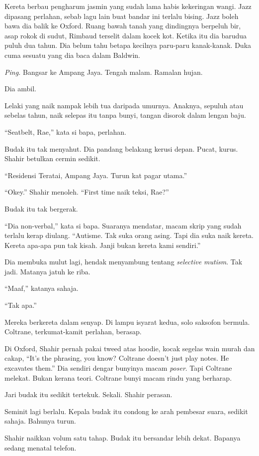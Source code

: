 \documentclass[
  11pt,
  a5paper,
  openany,
  oneside]{book}
\begin{document}
Kereta berbau pengharum jasmin yang sudah lama habis kekeringan wangi.
Jazz dipasang perlahan, sebab lagu lain buat bandar ini terlalu bising.
Jazz boleh bawa dia balik ke Oxford. Ruang bawah tanah yang dindingnya
berpeluh bir, asap rokok di sudut, Rimbaud terselit dalam kocek kot.
Ketika itu dia barudua puluh dua tahun. Dia belum tahu betapa kecilnya
paru-paru kanak-kanak. Duka cuma sesuatu yang dia baca dalam Baldwin.

\emph{Ping.} Bangsar ke Ampang Jaya. Tengah malam. Ramalan hujan.

Dia ambil.

Lelaki yang naik nampak lebih tua daripada umurnya. Anaknya, sepuluh
atau sebelas tahun, naik selepas itu tanpa bunyi, tangan disorok dalam
lengan baju.

``Seatbelt, Rae,'' kata si bapa, perlahan.

Budak itu tak menyahut. Dia pandang belakang kerusi depan. Pucat, kurus.
Shahir betulkan cermin sedikit.

``Residensi Teratai, Ampang Jaya. Turun kat pagar utama.''

``Okey.'' Shahir menoleh. ``First time naik teksi, Rae?''

Budak itu tak bergerak.

``Dia non-verbal,'' kata si bapa. Suaranya mendatar, macam skrip yang
sudah terlalu kerap diulang. ``Autisme. Tak suka orang asing. Tapi dia
suka naik kereta. Kereta apa-apa pun tak kisah. Janji bukan kereta kami
sendiri.''

Dia membuka mulut lagi, hendak menyambung tentang \emph{selective
mutism}. Tak jadi. Matanya jatuh ke riba.

``Maaf,'' katanya sahaja.

``Tak apa.''

Mereka berkereta dalam senyap. Di lampu isyarat kedua, solo saksofon
bermula. Coltrane, terkumat-kamit perlahan, berasap.

Di Oxford, Shahir pernah pakai tweed atas hoodie, kocak segelas wain
murah dan cakap, ``It's the phrasing, you know? Coltrane doesn't just
play notes. He excavates them.'' Dia sendiri dengar bunyinya macam
\emph{poser}. Tapi Coltrane melekat. Bukan kerana teori. Coltrane bunyi
macam rindu yang berharap.

Jari budak itu sedikit tertekuk. Sekali. Shahir perasan.

Seminit lagi berlalu. Kepala budak itu condong ke arah pembesar suara,
sedikit sahaja. Bahunya turun.

Shahir naikkan volum satu tahap. Budak itu bersandar lebih dekat.
Bapanya sedang menatal telefon.
\end{document}

